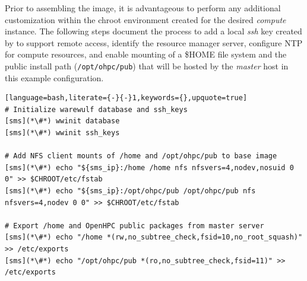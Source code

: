 Prior to assembling the image, it is advantageous to perform any additional
customization within the chroot environment created for the desired {\em
 compute} instance. The following steps document the process to add a local
{\em ssh} key created by \Warewulf{} to support remote access, identify the
resource manager server, configure NTP for compute resources, and enable \NFS{}
mounting of a \$HOME file system and the public \OHPC{} install path
(\texttt{/opt/ohpc/pub}) that will be hosted by the {\em master} host in this
example configuration.

\begin{lstlisting}[language=bash,literate={-}{-}1,keywords={},upquote=true]
# Initialize warewulf database and ssh_keys
[sms](*\#*) wwinit database
[sms](*\#*) wwinit ssh_keys

# Add NFS client mounts of /home and /opt/ohpc/pub to base image
[sms](*\#*) echo "${sms_ip}:/home /home nfs nfsvers=4,nodev,nosuid 0 0" >> $CHROOT/etc/fstab
[sms](*\#*) echo "${sms_ip}:/opt/ohpc/pub /opt/ohpc/pub nfs nfsvers=4,nodev 0 0" >> $CHROOT/etc/fstab

# Export /home and OpenHPC public packages from master server
[sms](*\#*) echo "/home *(rw,no_subtree_check,fsid=10,no_root_squash)" >> /etc/exports
[sms](*\#*) echo "/opt/ohpc/pub *(ro,no_subtree_check,fsid=11)" >> /etc/exports
\end{lstlisting}
